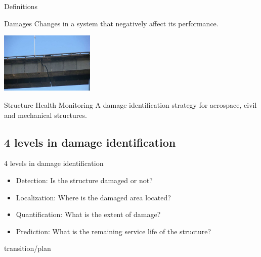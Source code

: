 \documentclass{beamer}
\begin{document}
\begin{frame}{Definitions}
\begin{exampleblock}{Damages}
Changes in a system that negatively affect its performance.
\end{exampleblock}
\begin{center}
	\includegraphics[width=4.5cm]{images/crack.jpg}
\end{center}
\begin{exampleblock}{Structure Health Monitoring}
A damage identification strategy for aerospace, civil and mechanical structures.
\end{exampleblock}

\end{frame}


\subsection{4 levels in damage identification}
\begin{frame}{4 levels in damage identification}

\begin{center}
\begin{itemize}[<+->]
\item Detection: Is the structure damaged or not?
\vspace{1\baselineskip}
\item Localization: Where is the damaged area located?
\vspace{1\baselineskip}
\item Quantification: What is the extent of damage?
\vspace{1\baselineskip}
\item Prediction: What is the remaining service life of the structure?
\end{itemize}
\end{center}
\end{frame}


\begin{frame}{transition/plan}
\end{frame}

\end{document}
